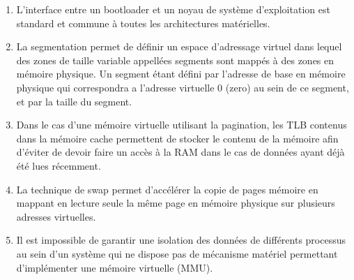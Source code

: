 \begin{enumerate}

\item L'interface entre un bootloader et un noyau de syst\`eme d'exploitation est standard et commune \`a toutes les architectures mat\'erielles.

\item La segmentation permet de d\'efinir un espace d'adressage virtuel dans lequel des zones de taille variable appell\'ees segments sont mapp\'es \`a des zones en m\'emoire physique. Un segment \'etant d\'efini par l'adresse de base en m\'emoire physique qui correspondra a l'adresse virtuelle 0 (zero) au sein de ce segment, et par la taille du segment.

\item Dans le cas d'une m\'emoire virtuelle utilisant la pagination, les TLB contenus dans la m\'emoire cache permettent de stocker le contenu de la m\'emoire afin d'\'eviter de devoir faire un acc\`es \`a la RAM dans le cas de donn\'ees ayant d\'ej\`a \'et\'e lues r\'ecemment.

\item La technique de swap permet d'acc\'el\'erer la copie de pages m\'emoire en mappant en lecture seule la m\^eme page en m\'emoire physique sur plusieurs adresses virtuelles.

\item Il est impossible de garantir une isolation des donn\'ees de diff\'erents processus au sein d'un syst\`eme qui ne dispose pas de m\'ecanisme mat\'eriel permettant d'impl\'ementer une m\'emoire virtuelle (MMU).

\end{enumerate}


